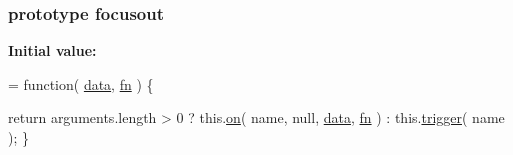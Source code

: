 \subsubsection[{focusout}]{ {\bf prototype} focusout}\label{jquery-1_810_82-vsdoc_8js_ac5fd3487b99e86d52fbef52f40d31565}
{\bfseries Initial value\+:}
\begin{DoxyCode}
= \textcolor{keyword}{function}( \hyperlink{jquery-1_810_82-vsdoc_8js_a609407b3456fdc3c5671a9fc4a226ff7}{data}, \hyperlink{jquery-1_810_82-vsdoc_8js_acef6bdaf6b9b20fdcca1ea86f0902c3b}{fn} ) \{


        \textcolor{keywordflow}{return} arguments.length > 0 ?
            this.\hyperlink{jquery-1_810_82-vsdoc_8js_ae453b412b883f60220d73468ef6c6dbc}{on}( name, null, \hyperlink{jquery-1_810_82-vsdoc_8js_a609407b3456fdc3c5671a9fc4a226ff7}{data}, \hyperlink{jquery-1_810_82-vsdoc_8js_acef6bdaf6b9b20fdcca1ea86f0902c3b}{fn} ) :
            this.\hyperlink{jquery-1_810_82-vsdoc_8js_a2388c4114d5e3e4eab020f973641519c}{trigger}( name );
    \}
\end{DoxyCode}
\hypertarget{jquery-1_810_82-vsdoc_8js_afbcf56cb9545c8bc885722b4fe4253ce}{}
